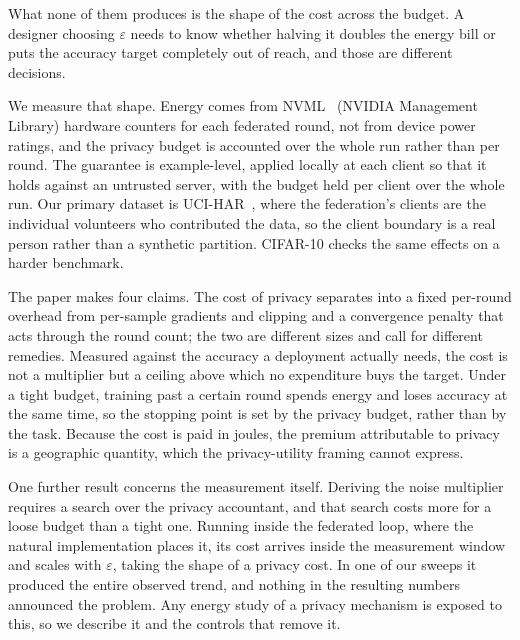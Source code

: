 What none of them produces is the shape of the cost across the budget. A
designer choosing $\varepsilon$ needs to know whether halving it doubles the
energy bill or puts the accuracy target completely out of reach, and those are
different decisions.
 
We measure that shape. Energy comes from NVML~\cite{corporation2024nvidia} (NVIDIA Management Library) 
hardware counters for each federated round, not from device power ratings, and the privacy
budget is accounted over the whole run rather than per round. The guarantee is
example-level, applied locally at each client so that it holds against an
untrusted server, with the budget held per client over the whole run. Our
primary dataset is UCI-HAR~\cite{anguita2013public}, where the federation's
clients are the individual volunteers who contributed the data, so the client
boundary is a real person rather than a synthetic partition. CIFAR-10 checks the same
effects on a harder benchmark.

The paper makes four claims. The cost of privacy separates into a fixed
per-round overhead from per-sample gradients and clipping and a convergence
penalty that acts through the round count; the two are different sizes and
call for different remedies. Measured against the accuracy a deployment
actually needs, the cost is not a multiplier but a ceiling above which no
expenditure buys the target. Under a tight budget, training past a certain
round spends energy and loses accuracy at the same time, so the stopping point
is set by the privacy budget, rather than by the task. Because the cost is
paid in joules, the premium attributable to privacy is a geographic quantity,
which the privacy-utility framing cannot express.
 
One further result concerns the measurement itself. Deriving the noise
multiplier requires a search over the privacy accountant, and that search
costs more for a loose budget than a tight one. Running inside the federated loop,
where the natural implementation places it, its cost arrives inside the
measurement window and scales with $\varepsilon$, taking the shape of a privacy cost. 
In one of our sweeps it produced the entire observed trend, and
nothing in the resulting numbers announced the problem. Any energy study of a
privacy mechanism is exposed to this, so we describe it and the controls that
remove it.